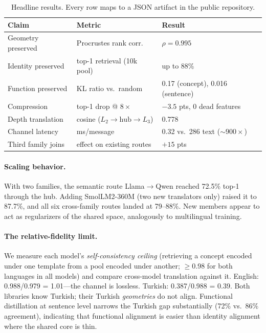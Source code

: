 \documentclass[11pt]{article}
\begin{document}
\begin{table}[h]
\centering
\begin{tabular}{lll}
\toprule
Claim & Metric & Result \\
\midrule
Geometry preserved & Procrustes rank corr. & $\rho=0.995$ \\
Identity preserved & top-1 retrieval (10k pool) & up to 88\% \\
Function preserved & KL ratio vs.\ random & 0.17 (concept), 0.016 (sentence) \\
Compression & top-1 drop @ $8\times$ & $-3.5$ pts, 0 dead features \\
Depth translation & cosine ($L_2\!\to\!\text{hub}\!\to\!L_3$) & 0.778 \\
Channel latency & ms/message & 0.32 vs.\ 286 text (${\sim}900\times$) \\
Third family joins & effect on existing routes & $+15$ pts \\
\bottomrule
\end{tabular}
\caption{Headline results. Every row maps to a JSON artifact in the public
repository.}
\end{table}

\paragraph{Scaling behavior.} With two families, the semantic route
Llama$\to$Qwen reached 72.5\% top-1 through the hub. Adding SmolLM2-360M
(two new translators only) raised it to 87.7\%, and all six cross-family
routes landed at 79--88\%. New members appear to act as regularizers of the
shared space, analogously to multilingual training.

\paragraph{The relative-fidelity limit.} We measure each model's
\emph{self-consistency ceiling} (retrieving a concept encoded under one
template from a pool encoded under another; $\geq$0.98 for both languages in
all models) and compare cross-model translation against it. English:
0.988/0.979 = 1.01---the channel is lossless. Turkish: 0.387/0.988 = 0.39.
Both libraries know Turkish; their Turkish \emph{geometries} do not align.
Functional distillation at sentence level narrows the Turkish gap
substantially (72\% vs.\ 86\% agreement), indicating that functional
alignment is easier than identity alignment where the shared core is thin.
\end{document}
